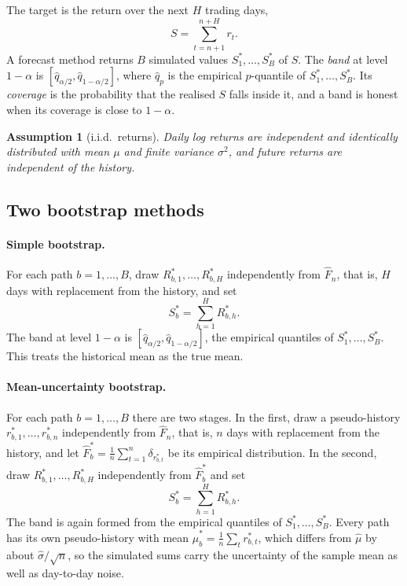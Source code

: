\documentclass{article}
\newcommand{\muhat}{\hat\mu}
\newtheorem{assumption}{Assumption}
\begin{document}
The target is the return over the next $H$ trading days,
\[
  S=\sum_{t=n+1}^{n+H} r_t .
\]
A forecast method returns $B$ simulated values $S^*_1,\dots,S^*_B$ of $S$. The \emph{band} at level
$1-\alpha$ is $[\hat q_{\alpha/2},\hat q_{1-\alpha/2}]$, where $\hat q_p$ is the empirical
$p$-quantile of $S^*_1,\dots,S^*_B$. Its \emph{coverage} is the probability that the realised $S$
falls inside it, and a band is honest when its coverage is close to $1-\alpha$.

\begin{assumption}[i.i.d.\ returns]\label{as:iid}
Daily log returns are independent and identically distributed with mean $\mu$ and finite variance
$\sigma^2$, and future returns are independent of the history.
\end{assumption}

\subsection{Two bootstrap methods}
\paragraph{Simple bootstrap.} For each path $b=1,\dots,B$, draw $R^*_{b,1},\dots,R^*_{b,H}$
independently from $\hat F_n$, that is, $H$ days with replacement from the history, and set
\[
  S^*_b=\sum_{h=1}^{H} R^*_{b,h}.
\]
The band at level $1-\alpha$ is $[\hat q_{\alpha/2},\hat q_{1-\alpha/2}]$, the empirical quantiles
of $S^*_1,\dots,S^*_B$. This treats the historical mean as the true mean.

\paragraph{Mean-uncertainty bootstrap.} For each path $b=1,\dots,B$ there are two stages. In the
first, draw a pseudo-history $r^*_{b,1},\dots,r^*_{b,n}$ independently from $\hat F_n$, that is, $n$
days with replacement from the history, and let $\hat F^*_b=\frac1n\sum_{t=1}^{n}\delta_{r^*_{b,t}}$
be its empirical distribution. In the second, draw $R^*_{b,1},\dots,R^*_{b,H}$ independently from
$\hat F^*_b$ and set
\[
  S^*_b=\sum_{h=1}^{H} R^*_{b,h}.
\]
The band is again formed from the empirical quantiles of $S^*_1,\dots,S^*_B$. Every path has its own
pseudo-history with mean $\muhat^*_b=\frac1n\sum_t r^*_{b,t}$, which differs from $\muhat$ by about
$\hat\sigma/\sqrt{n}$, so the simulated sums carry the uncertainty of the sample mean as well as
day-to-day noise.
\end{document}
